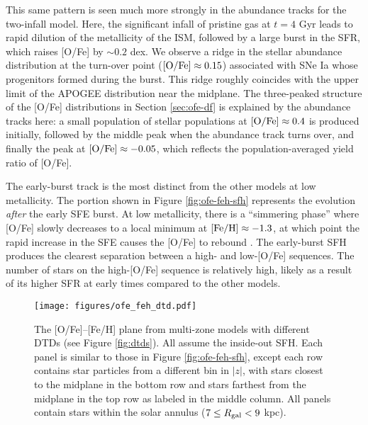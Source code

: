 \documentclass[twocolumn,twocolappendix,linenumbers]{aastex631}
\begin{document}
This same pattern is seen much more strongly in the abundance tracks for the two-infall model. Here, the significant infall of pristine gas at $t=4$ Gyr leads to rapid dilution of the metallicity of the ISM, followed by a large burst in the SFR, which raises [O/Fe] by $\sim 0.2$ dex. 
We observe a ridge in the stellar abundance distribution at the turn-over point (${\rm [O/Fe]}\approx0.15$) associated with SNe Ia whose progenitors formed during the burst. This ridge roughly coincides with the upper limit of the APOGEE distribution near the midplane. The three-peaked structure of the [O/Fe] distributions in Section \ref{sec:ofe-df} is explained by the abundance tracks here: a small population of stellar populations at ${\rm [O/Fe]}\approx0.4$ is produced initially, followed by the middle peak when the abundance track turns over, and finally the peak at ${\rm [O/Fe]}\approx-0.05$, which reflects the population-averaged yield ratio of [O/Fe].

The early-burst track is the most distinct from the other models at low metallicity. The portion shown in Figure \ref{fig:ofe-feh-sfh} represents the evolution {\it after} the early SFE burst. At low metallicity, there is a ``simmering phase'' where [O/Fe] slowly decreases to a local minimum at ${\rm [Fe/H]}\approx-1.3$, at which point the rapid increase in the SFE causes the [O/Fe] to rebound \citep[a more thorough examination of this behavior can be found in][]{Conroy2022-ThickDisk}.
The early-burst SFH produces the clearest separation between a high- and low-[O/Fe] sequences. The number of stars on the high-[O/Fe] sequence is relatively high, likely as a result of its higher SFR at early times compared to the other models.

\begin{figure*}
    \centering
    \texttt{[image: figures/ofe\_feh\_dtd.pdf]}
    \caption{The [O/Fe]--[Fe/H] plane from multi-zone models with different DTDs (see Figure \ref{fig:dtds}). All assume the inside-out SFH. Each panel is similar to those in Figure \ref{fig:ofe-feh-sfh}, except each row contains star particles from a different bin in $|z|$, with stars closest to the midplane in the bottom row and stars farthest from the midplane in the top row as labeled in the middle column. All panels contain stars within the solar annulus ($7\leq R_{\rm gal}<9$ kpc).}
    \label{fig:ofe-feh-dtd}
\end{figure*}
\end{document}

